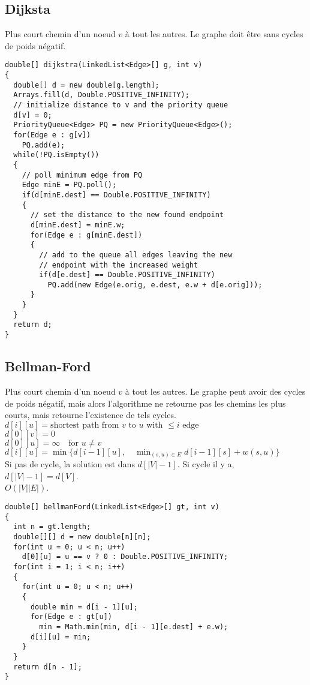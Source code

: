 \subsection{Dijksta}
Plus court chemin d'un noeud $v$ à tout les autres. Le graphe doit être sans cycles de poids négatif.\\

\begin{lstlisting}
double[] dijkstra(LinkedList<Edge>[] g, int v)
{
  double[] d = new double[g.length];
  Arrays.fill(d, Double.POSITIVE_INFINITY);
  // initialize distance to v and the priority queue
  d[v] = 0;
  PriorityQueue<Edge> PQ = new PriorityQueue<Edge>();
  for(Edge e : g[v])
    PQ.add(e);
  while(!PQ.isEmpty())
  {
    // poll minimum edge from PQ
    Edge minE = PQ.poll();
    if(d[minE.dest] == Double.POSITIVE_INFINITY)
    {
      // set the distance to the new found endpoint
      d[minE.dest] = minE.w;
      for(Edge e : g[minE.dest])
      {
        // add to the queue all edges leaving the new
        // endpoint with the increased weight
        if(d[e.dest] == Double.POSITIVE_INFINITY)
          PQ.add(new Edge(e.orig, e.dest, e.w + d[e.orig]));
      }
    }
  }
  return d;
}
\end{lstlisting}
\subsection{Bellman-Ford\label{BellmanFord}}
Plus court chemin d'un noeud $v$ à tout les autres. Le graphe peut avoir des cycles de poids négatif, mais alors l'algorithme ne retourne pas les chemins les plus courts, mais retourne l'existence de tels cycles.\\
$d[i][u] = \text{shortest path from $v$ to $u$ with $\leq i$ edge}$\\
$d[0][v] = 0$ \\
$d[0][u] = \infty \quad \text{for $u \neq v$}$\\
$d[i][u] = \min \{ 
d[i - 1][u], \quad
\min_{(s, u) \in E} d[i - 1][s] + w(s, u) \}$\\
Si pas de cycle, la solution est dans $d[|V|-1]$. Si cycle il y a, $d[|V|-1]=d[V]$.\\
$O(|V||E|)$.\\

\begin{lstlisting}
double[] bellmanFord(LinkedList<Edge>[] gt, int v)
{
  int n = gt.length;
  double[][] d = new double[n][n];
  for(int u = 0; u < n; u++)
    d[0][u] = u == v ? 0 : Double.POSITIVE_INFINITY;
  for(int i = 1; i < n; i++)
  {
    for(int u = 0; u < n; u++)
    {
      double min = d[i - 1][u];
      for(Edge e : gt[u])
        min = Math.min(min, d[i - 1][e.dest] + e.w);
      d[i][u] = min;
    }
  }
  return d[n - 1];
}
\end{lstlisting}
